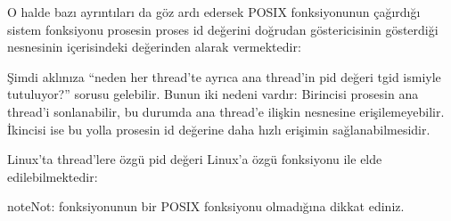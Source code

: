 \documentclass[a4paper,10pt,turkish]{sphinxmanual}
\begin{document}
\begin{sphinxVerbatim}[commandchars=\\\{\}]
\end{sphinxVerbatim}

\sphinxAtStartPar
O halde bazı ayrıntıları da göz ardı edersek  POSIX fonksiyonunun çağırdığı  sistem
fonksiyonu prosesin proses id değerini doğrudan  göstericisinin gösterdiği 
nesnesinin içerisindeki  değerinden alarak vermektedir:


\sphinxAtStartPar
Şimdi aklınıza “neden her thread’te ayrıca ana thread’in pid değeri tgid ismiyle tutuluyor?” sorusu
gelebilir. Bunun iki nedeni vardır: Birincisi prosesin ana thread’i sonlanabilir, bu durumda ana thread’e
ilişkin  nesnesine erişilemeyebilir. İkincisi ise bu yolla prosesin id değerine daha hızlı
erişimin sağlanabilmesidir.

\sphinxAtStartPar
Linux’ta thread’lere özgü pid değeri Linux’a özgü  fonksiyonu ile elde edilebilmektedir:

\begin{sphinxVerbatim}[commandchars=\\\{\}]

\end{sphinxVerbatim}

\begin{sphinxadmonition}{note}{Not:}
\sphinxAtStartPar
{} fonksiyonunun bir POSIX fonksiyonu olmadığına dikkat ediniz.
\end{sphinxadmonition}
\end{document}
